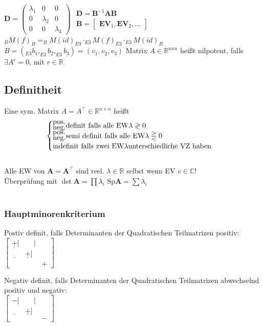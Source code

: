\documentclass[6pt,a4paper]{scrartcl}
\newcommand{\mat}[1]{\ensuremath{\begin{bmatrix} #1 \end{bmatrix}}}								%
\newcommand{\ma}[1]{\ensuremath{\boldsymbol {#1}}}												%
\renewcommand{\vec}[1]{\ensuremath{\boldsymbol {#1}}}											%
\newcommand{\R}{\ensuremath{\mathbb R}}
\begin{document}
\begin{multicols*}{4}
$\ma D = \begin{pmatrix} \lambda_1 & 0 & 0 \\ 0 & \lambda_2 & 0 \\ 0 & 0 & \lambda_3 \end{pmatrix}$ \qquad $\begin{array}{l} \ma D = \ma B^{-1} \ma A \ma B \\[0.5em] \ma B = \mat{\vec{EV}_1, \vec{EV}_2, ...} \end{array}$\\
$_B M(f)_B = _B M (id)_{E3} \cdot _{E3} M(f)_{E3} \cdot _{E3} M(id)_B$ \\
$B = ( _{E3} b_1 , _{E3} b_2 ,_{E3} b_3 ) = (v_1, v_2, v_3)$
\fi
Matrix $A \in \R^{nxn}$ heißt nilpotent, falls $\exists A^r = 0$, mit $r \in \R$\\ 
\subsection{Definitheit}
Eine sym. Matrix $A = A^\top \in \mathbb R^{n\times n}$ heißt\\%
\[\begin{cases}
_{\text{\normalsize neg.}}^{\text{\normalsize pos.}} \text{definit falls alle EW} \lambda \gtrless 0\\
_{\text{\normalsize neg.}}^{\text{\normalsize pos.}} \text{semi definit falls alle EW} \lambda \gtreqless 0\\
\text{indefinit falls zwei EW} \lambda \text{unterschiedliche VZ haben}
\end{cases}\]\\
Alle EW von $\ma A = \ma A^\top$ sind reel. $\lambda \in \mathbb R$ selbst wenn EV $v \in \mathbb C$!\\
Überprüfung mit $\det \ma A = \prod \lambda_i$ \qquad $\mathrm{Sp} \ma A = \sum \lambda_i$\\ \\

\subsubsection{Hauptminorenkriterium}

\begin{minipage}[t]{0.48\linewidth}
Postiv definit, falls Determinanten der Quadratischen Teilmatrizen positiv:\\
$\mat{\underline{+}|&\phantom{+}|&\\\underline{\phantom{+}}&\underline{+}|&\\&&+}$
\end{minipage}
\hspace{.04\linewidth}
\begin{minipage}[t]{0.48\linewidth}
Negativ definit, falls Determinanten der Quadratischen Teilmatrizen abwechselnd positiv und negativ:\\
$\mat{\underline{-}|&\phantom{+}|&\\\underline{\phantom{+}}&\underline{+}|&\\&&-}$
\end{minipage}


\end{multicols*}
\end{document}
